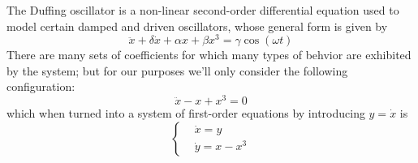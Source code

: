 The Duffing oscillator is a non-linear second-order differential equation used to model 
certain damped and driven oscillators, whose general form is given by
\begin{equation}
    \ddot{x} + \delta\dot{x} + \alpha x + \beta x^3 = \gamma\cos(\omega t)
\end{equation}
There are many sets of coefficients for which many types of behvior are exhibited by the
system; but for our purposes we'll only consider the following configuration:
\begin{equation}
    \ddot{x} - x + x^3 = 0
\end{equation}
which when turned into a system of first-order equations by introducing $y = \dot{x}$ is
\begin{equation}
    \begin{cases}
        & \dot{x} = y \\
        & \dot{y} = x - x^3  
    \end{cases}
\end{equation}

